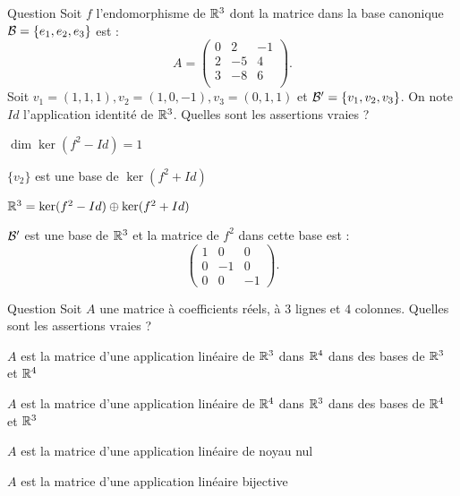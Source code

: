 \begin{multi}[multiple,feedback=
{On vérifie que  
\(\{v_1\}\) est une base de \(\ker (f^2-Id)\), que  
\(\{v_2 ,v_3\}\) est une base de \(\ker (f^2+Id)\) et que  \({\cal B}' = \{ v_1, v_2,  v_3\}\) est une base de \(\Rr^3\).
On en déduit que :
\[\Rr^3=\ker (f^2-Id) \oplus \ker (f^2+Id).\]
La matrice de \(f^2\) dans la base \({\cal B}'\) est : \(\left(\begin{array}{rcc} 1&0&0\\ 0 &-1&0\\ 
0&0&-1\end{array}\right)\).
}]{Question}
Soit \(f\) l'endomorphisme de \(\Rr^3\) dont la matrice dans la base canonique \({\cal B}=\{e_1,e_2,e_3\}\) est : 
\[A = \left(\begin{array}{rcc}
0&2&-1\\
2&-5&4\\ 
3&-8&6\\
\end{array}\right).\]
Soit \(v_1=(1,1,1), v_2=(1,0,-1),  v_3=(0,1,1)\) et \({\cal B}' = \{ v_1, v_2,  v_3\}\). On note \(Id\) l'application identité de \(\Rr^3\). 
Quelles sont les assertions vraies ?

    \item* \(\dim \ker (f^2-Id) =1\)
    \item \(\{v_2\}\) est une base de \(\ker (f^2+Id)\)
    \item* \(\mathbb{R}^3=\ker (f^2-Id) \oplus \ker (f^2+Id)\)
    \item* \({\cal B}'\) est une base de \(\Rr^3\) et la matrice de \(f^2\) dans cette base est :
\[\left(\begin{array}{rcc}
1&0&0\\ 0 &-1&0\\ 0&0&-1\end{array}\right).\]
\end{multi}


\begin{multi}[multiple,feedback=
{\(A\) est la matrice d'une application linéaire \(f: \Rr^4 \to \Rr^3\) dans des bases de \(\Rr^4\) et
\(\Rr^3\). D'après le théorème du rang, le noyau d'une telle application est non nul.
\vskip0mm
Comme \(A\) n'est pas une matrice carrée, \(A\) n'est pas inversible et donc si \(f\) est une application linéaire de matrice
\(A\), \(f\) n'est pas bijective.
}]{Question}
Soit \(A\) une matrice à coefficients réels, à \(3\) lignes et \(4\) colonnes. Quelles sont les assertions vraies ?

    \item \(A\) est la matrice d'une application linéaire de \(\Rr^3\) dans \(\Rr^4\) dans des bases de \(\Rr^3\) et \(\Rr^4\)
    \item* \(A\) est la matrice d'une application linéaire de \(\Rr^4\) dans \(\Rr^3\) dans  des bases de \(\Rr^4\) et \(\Rr^3\)
    \item \(A\) est la matrice d'une application linéaire de noyau  nul
    \item \(A\) est la matrice d'une application linéaire bijective
\end{multi}


